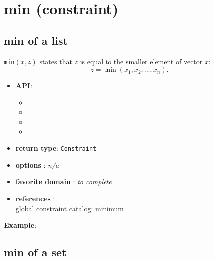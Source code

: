 \label{min}
\hypertarget{min}{}

\section{min (constraint)}\label{min:minconstraint}\hypertarget{min:minconstraint}{}

\subsection{min of a list}\label{min:minofalist}\hypertarget{min:minofalist}{}

\begin{notedef}
  \texttt{min}$(x,z)$ states that $z$ is equal to the smaller element
  of vector $x$:
$$z = \min(x_1, x_2, ..., x_n).$$
\end{notedef}
\begin{itemize}
	\item \textbf{API}:
	\begin{itemize}
		\item {}
		\item {}
		\item {}
		\item {}
	\end{itemize}
	\item \textbf{return type}: \texttt{Constraint}
	\item \textbf{options} : \emph{n/a}
	\item \textbf{favorite domain} : \emph{to complete}
	\item \textbf{references} :\\
      global constraint catalog: \href{http://www.emn.fr/x-info/sdemasse/gccat/Cminimum.html}{minimum}
\end{itemize}

\textbf{Example}:


\subsection{min of a set}\label{min:minofaset}\hypertarget{min:minofaset}{}

